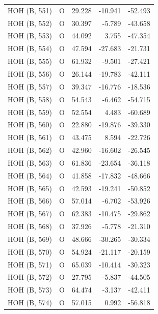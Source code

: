 \begin{longtable}{@{}lcrr@{}}
  \cmidrule(r){1-5}
  HOH (B, 551) & O & 29.228 & -10.941 & -52.493 \\
  \cmidrule(r){1-5}
  HOH (B, 552) & O & 30.397 & -5.789 & -43.658 \\
  \cmidrule(r){1-5}
  HOH (B, 553) & O & 44.092 & 3.755 & -47.354 \\
  \cmidrule(r){1-5}
  HOH (B, 554) & O & 47.594 & -27.683 & -21.731 \\
  \cmidrule(r){1-5}
  HOH (B, 555) & O & 61.932 & -9.501 & -27.421 \\
  \cmidrule(r){1-5}
  HOH (B, 556) & O & 26.144 & -19.783 & -42.111 \\
  \cmidrule(r){1-5}
  HOH (B, 557) & O & 39.347 & -16.776 & -18.536 \\
  \cmidrule(r){1-5}
  HOH (B, 558) & O & 54.543 & -6.462 & -54.715 \\
  \cmidrule(r){1-5}
  HOH (B, 559) & O & 52.554 & 4.483 & -60.689 \\
  \cmidrule(r){1-5}
  HOH (B, 560) & O & 22.880 & -19.876 & -39.330 \\
  \cmidrule(r){1-5}
  HOH (B, 561) & O & 43.475 & 8.594 & -22.726 \\
  \cmidrule(r){1-5}
  HOH (B, 562) & O & 42.960 & -16.602 & -26.545 \\
  \cmidrule(r){1-5}
  HOH (B, 563) & O & 61.836 & -23.654 & -36.118 \\
  \cmidrule(r){1-5}
  HOH (B, 564) & O & 41.858 & -17.832 & -48.666 \\
  \cmidrule(r){1-5}
  HOH (B, 565) & O & 42.593 & -19.241 & -50.852 \\
  \cmidrule(r){1-5}
  HOH (B, 566) & O & 57.014 & -6.702 & -53.926 \\
  \cmidrule(r){1-5}
  HOH (B, 567) & O & 62.383 & -10.475 & -29.862 \\
  \cmidrule(r){1-5}
  HOH (B, 568) & O & 37.926 & -5.778 & -21.310 \\
  \cmidrule(r){1-5}
  HOH (B, 569) & O & 48.666 & -30.265 & -30.334 \\
  \cmidrule(r){1-5}
  HOH (B, 570) & O & 54.924 & -21.117 & -20.159 \\
  \cmidrule(r){1-5}
  HOH (B, 571) & O & 65.039 & -10.414 & -30.323 \\
  \cmidrule(r){1-5}
  HOH (B, 572) & O & 27.795 & -5.837 & -44.505 \\
  \cmidrule(r){1-5}
  HOH (B, 573) & O & 64.474 & -3.137 & -42.411 \\
  \cmidrule(r){1-5}
  HOH (B, 574) & O & 57.015 & 0.992 & -56.818 \\

\end{longtable}
